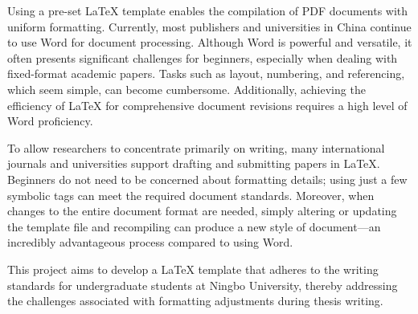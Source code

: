 \begin{abstract}
\LaTeX{}通过使用预设的模板，可以编译成格式统一的PDF文档。目前，国内多数出版社和高校仍然使用Word进行文档编辑。尽管Word功能强大且灵活，但对于新手来说，在处理格式固定的学术论文时，排版、编号、引用文献等看似简单的任务却常常带来许多困难和麻烦。特别是在需要对整篇文章进行修改时，要想达到\LaTeX{}的效率，Word用户需要具备较高的技术水平。

\begin{center}
\texttt{[image: mm-QR]}\\

关注周老师的公众号，对话框内回复“宁大模板”下载最新模板
\end{center}

为了让研究人员能够将主要精力集中在论文写作上，许多国际期刊和高校支持使用LaTeX进行论文的撰写和提交。新手无需担心格式问题，只需使用少数标签即可生成符合要求的文档。而在需要全文格式更改时，仅需更换或修改模板文件，然后重新编译，即可获得全新的文档样式，这对于习惯使用Word的新手来说，几乎是不可思议的。

本项目旨在创建一个符合宁波大学本科生论文撰写规范的\LaTeX{}模板，以解决学位论文撰写中的格式调整问题。

\end{abstract}


\begin{abstractEN}
Using a pre-set \LaTeX{} template enables the compilation of PDF documents with uniform formatting. Currently, most publishers and universities in China continue to use Word for document processing. Although Word is powerful and versatile, it often presents significant challenges for beginners, especially when dealing with fixed-format academic papers. Tasks such as layout, numbering, and referencing, which seem simple, can become cumbersome. Additionally, achieving the efficiency of \LaTeX{} for comprehensive document revisions requires a high level of Word proficiency.

To allow researchers to concentrate primarily on writing, many international journals and universities support drafting and submitting papers in \LaTeX{}. Beginners do not need to be concerned about formatting details; using just a few symbolic tags can meet the required document standards. Moreover, when changes to the entire document format are needed, simply altering or updating the template file and recompiling can produce a new style of document—an incredibly advantageous process compared to using Word.

This project aims to develop a \LaTeX{} template that adheres to the writing standards for undergraduate students at Ningbo University, thereby addressing the challenges associated with formatting adjustments during thesis writing.
    
\end{abstractEN}




